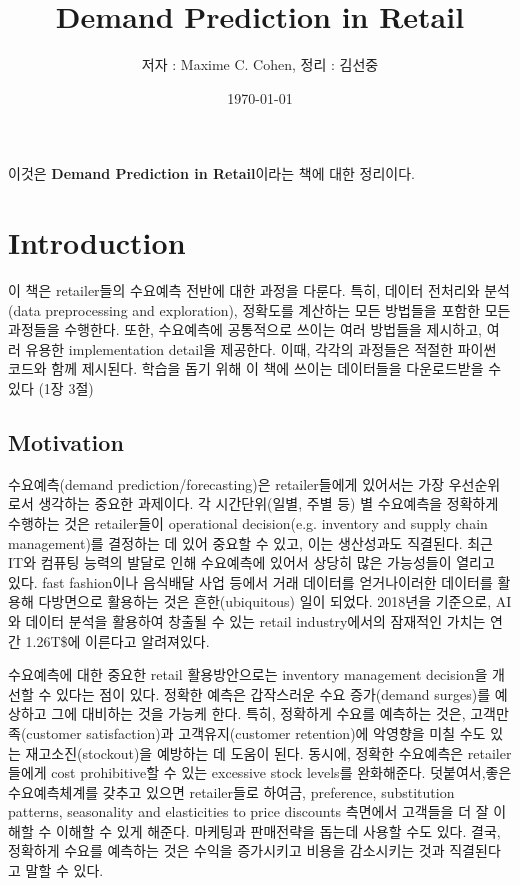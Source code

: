 \documentclass{report}
\begin{document}
\title{Demand Prediction in Retail}
\author{저자 : Maxime C. Cohen, 정리 : 김선중}
\date{\today}
\maketitle

이것은 \textbf{Demand Prediction in Retail}이라는 책에 대한 정리이다.
\tableofcontents

\newpage

\chapter{Introduction}
이 책은 retailer들의 수요예측 전반에 대한 과정을 다룬다.
특히, 데이터 전처리와 분석(data preprocessing and exploration), 정확도를 계산하는 모든 방법들을 포함한 모든 과정들을 수행한다.
또한, 수요예측에 공통적으로 쓰이는 여러 방법들을 제시하고, 여러 유용한 implementation detail을 제공한다.
이때, 각각의 과정들은 적절한 파이썬 코드와 함께 제시된다.
학습을 돕기 위해 이 책에 쓰이는 데이터들을 다운로드받을 수 있다 (1장 3절)

\section{Motivation}
수요예측(demand prediction/forecasting)은 retailer들에게 있어서는 가장 우선순위로서 생각하는 중요한 과제이다.
각 시간단위(일별, 주별 등) 별 수요예측을 정확하게 수행하는 것은 retailer들이 operational decision(e.g. inventory and supply chain management)를 결정하는 데 있어 중요할 수 있고, 이는 생산성과도 직결된다.
최근 IT와 컴퓨팅 능력의 발달로 인해 수요예측에 있어서 상당히 많은 가능성들이 열리고 있다.
fast fashion이나 음식배달 사업 등에서 거래 데이터를 얻거나이러한 데이터를 활용해 다방면으로 활용하는 것은 흔한(ubiquitous) 일이 되었다.
2018년을 기준으로, AI와 데이터 분석을 활용하여 창출될 수 있는 retail industry에서의 잠재적인 가치는 연간 1.26T\$에 이른다고 알려져있다.

수요예측에 대한 중요한 retail 활용방안으로는 inventory management decision을 개선할 수 있다는 점이 있다.
정확한 예측은 갑작스러운 수요 증가(demand surges)를 예상하고 그에 대비하는 것을 가능케 한다.
특히, 정확하게 수요를 예측하는 것은, 고객만족(customer satisfaction)과 고객유지(customer retention)에 악영향을 미칠 수도 있는 재고소진(stockout)을 예방하는 데 도움이 된다.
동시에, 정확한 수요예측은 retailer들에게 cost prohibitive할 수 있는 excessive stock levels를 완화해준다.
덧붙여서,좋은 수요예측체계를 갖추고 있으면 retailer들로 하여금, preference, substitution patterns, seasonality and elasticities to price discounts 측면에서 고객들을 더 잘 이해할 수 이해할 수 있게 해준다.
마케팅과 판매전략을 돕는데 사용할 수도 있다.
결국, 정확하게 수요를 예측하는 것은 수익을 증가시키고 비용을 감소시키는 것과 직결된다고 말할 수 있다.
\end{document}
